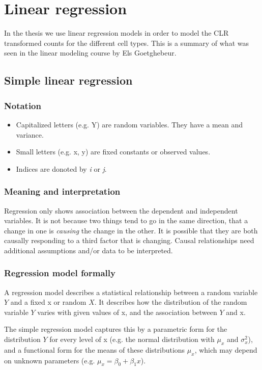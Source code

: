 \section{Linear regression}

In the thesis we use linear regression models in order to model the CLR transformed counts for the different cell types.
This is a summary of what was seen in the linear modeling course by Els Goetghebeur.

\subsection{Simple linear regression}
\subsubsection{Notation}
\begin{itemize}
    \item Capitalized letters (e.g. Y) are random variables. They have a mean and variance.
    \item Small letters (e.g. x, y) are fixed constants or observed values.
    \item Indices are donoted by \textit{i} or \textit{j}.
\end{itemize}

\subsubsection{Meaning and interpretation}
Regression only shows association between the dependent and independent variables.
It is not because two things tend to go in the same direction, that a change in one is \textit{causing} the change in the other.
It is possible that they are both causally responding to a third factor that is changing.
Causal relationships need additional assumptions and/or data to be interpreted.

\subsubsection{Regression model formally}
A regression model describes a statistical relationship between a random variable $Y$ and a fixed x or random $X$.
It describes how the distribution of the random variable $Y$ varies with given values of x, and the association between $Y$ and x.

The simple regression model captures this by a parametric form for the distribution $Y$ for every level of x (e.g. the normal distribution with $\mu_x$ and $\sigma_x^2$), and a functional form for the means of these distributions $\mu_x$, which may depend on unknown parameters (e.g. $\mu_x = \beta_0 + \beta_1 x$).

